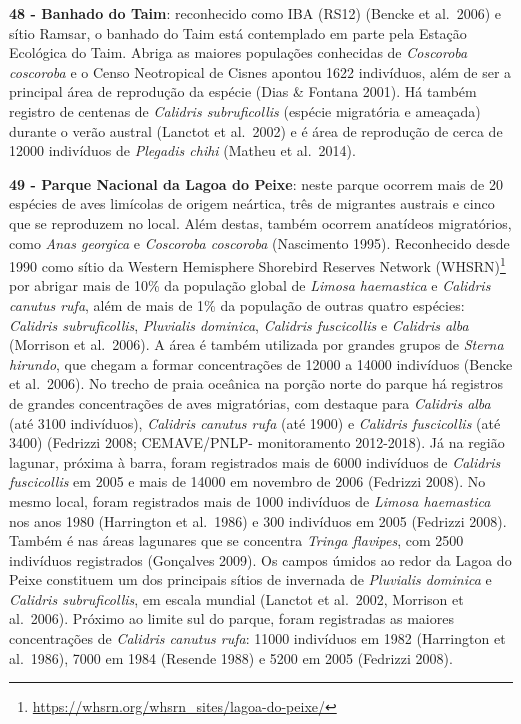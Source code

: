 \documentclass[
  oneside]{scrbook}
\DeclareRobustCommand{\href}[2]{#2\footnote{\url{#1}}}
\begin{document}
\textbf{48 - Banhado do Taim}: reconhecido como IBA (RS12) (Bencke et al.~2006) e sítio Ramsar, o banhado do Taim está contemplado em parte pela Estação Ecológica do Taim. Abriga as maiores populações conhecidas de \emph{Coscoroba coscoroba} e o Censo Neotropical de Cisnes apontou 1622 indivíduos, além de ser a principal área de reprodução da espécie (Dias \& Fontana 2001). Há também registro de centenas de \emph{Calidris subruficollis} (espécie migratória e ameaçada) durante o verão austral (Lanctot et al.~2002) e é área de reprodução de cerca de 12000 indivíduos de \emph{Plegadis chihi} (Matheu et al.~2014).

\textbf{49 - Parque Nacional da Lagoa do Peixe}: neste parque ocorrem mais de 20 espécies de aves limícolas de origem neártica, três de migrantes austrais e cinco que se reproduzem no local. Além destas, também ocorrem anatídeos migratórios, como \emph{Anas georgica} e \emph{Coscoroba coscoroba} (Nascimento 1995). Reconhecido desde 1990 como \href{https://whsrn.org/whsrn_sites/lagoa-do-peixe/}{sítio da Western Hemisphere Shorebird Reserves Network (WHSRN)} por abrigar mais de 10\% da população global de \emph{Limosa haemastica} e \emph{Calidris canutus rufa}, além de mais de 1\% da população de outras quatro espécies: \emph{Calidris subruficollis}, \emph{Pluvialis dominica}, \emph{Calidris fuscicollis} e \emph{Calidris alba} (Morrison et al.~2006). A área é também utilizada por grandes grupos de \emph{Sterna hirundo}, que chegam a formar concentrações de 12000 a 14000 indivíduos (Bencke et al.~2006). No trecho de praia oceânica na porção norte do parque há registros de grandes concentrações de aves migratórias, com destaque para \emph{Calidris alba} (até 3100 indivíduos), \emph{Calidris canutus rufa} (até 1900) e \emph{Calidris fuscicollis} (até 3400) (Fedrizzi 2008; CEMAVE/PNLP- monitoramento 2012-2018). Já na região lagunar, próxima à barra, foram registrados mais de 6000 indivíduos de \emph{Calidris fuscicollis} em 2005 e mais de 14000 em novembro de 2006 (Fedrizzi 2008). No mesmo local, foram registrados mais de 1000 indivíduos de \emph{Limosa haemastica} nos anos 1980 (Harrington et al.~1986) e 300 indivíduos em 2005 (Fedrizzi 2008). Também é nas áreas lagunares que se concentra \emph{Tringa flavipes}, com 2500 indivíduos registrados (Gonçalves 2009). Os campos úmidos ao redor da Lagoa do Peixe constituem um dos principais sítios de invernada de \emph{Pluvialis dominica} e \emph{Calidris subruficollis}, em escala mundial (Lanctot et al.~2002, Morrison et al.~2006). Próximo ao limite sul do parque, foram registradas as maiores concentrações de \emph{Calidris canutus rufa}: 11000 indivíduos em 1982 (Harrington et al.~1986), 7000 em 1984 (Resende 1988) e 5200 em 2005 (Fedrizzi 2008).
\end{document}
